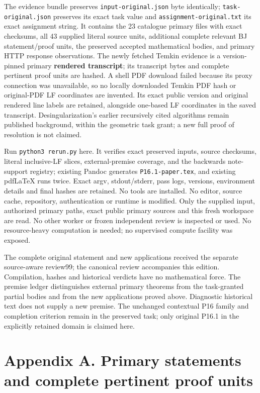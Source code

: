 \documentclass[
  10pt,
]{article}
\begin{document}
The evidence bundle preserves \texttt{input-original.json} byte
identically; \texttt{task-original.json} preserves its exact task value
and \texttt{assignment-original.txt} its exact assignment string. It
contains the 23 catalogue primary files with exact checksums, all 43
supplied literal source units, additional complete relevant BJ
statement/proof units, the preserved accepted mathematical bodies, and
primary HTTP response observations. The newly fetched Temkin evidence is
a version-pinned primary \textbf{rendered transcript}; its transcript
bytes and complete pertinent proof units are hashed. A shell PDF
download failed because its proxy connection was unavailable, so no
locally downloaded Temkin PDF hash or original-PDF LF coordinates are
invented. Its exact public version and original rendered line labels are
retained, alongside one-based LF coordinates in the saved transcript.
Desingularization's earlier recursively cited algorithms remain
published background, within the geometric task grant; a new full proof
of resolution is not claimed.

Run \texttt{python3\ rerun.py} here. It verifies exact preserved inputs,
source checksums, literal inclusive-LF slices, external-premise
coverage, and the backwards note-support registry; existing Pandoc
generates \texttt{P16.1-paper.tex}, and existing pdfLaTeX runs twice.
Exact argv, stdout/stderr, pass logs, versions, environment details and
final hashes are retained. No tools are installed. No editor, source
cache, repository, authentication or runtime is modified. Only the
supplied input, authorized primary paths, exact public primary sources
and this fresh workspace are read. No other worker or frozen independent
review is inspected or used. No resource-heavy computation is needed; no
supervised compute facility was exposed.

The complete original statement and new applications received the separate
source-aware review99; the canonical review accompanies this edition.
Compilation, hashes and historical verdicts have no mathematical force. The premise ledger
distinguishes external primary theorems from the task-granted partial
bodies and from the new applications proved above. Diagnostic historical
text does not supply a new premise. The unchanged contextual P16 family
and completion criterion remain in the preserved task; only original
P16.1 in the explicitly retained domain is claimed here.

\section{Appendix A. Primary statements and complete pertinent proof
units}\label{appendix-a.-primary-statements-and-complete-pertinent-proof-units}
\end{document}

